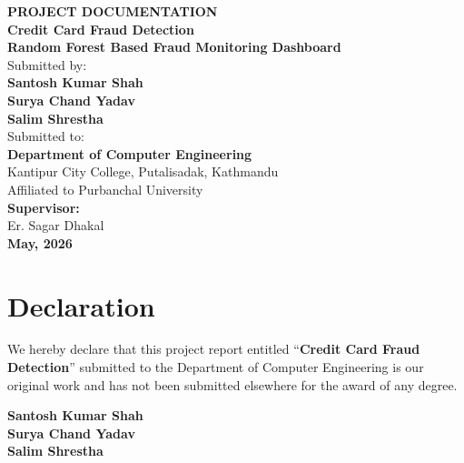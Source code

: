 \documentclass[12pt,a4paper]{report}
\newcommand{\projecttitle}{Credit Card Fraud Detection}
\newcommand{\projectsubtitle}{Random Forest Based Fraud Monitoring Dashboard}
\begin{document}
\setcounter{page}{1}

\begin{titlepage}
    \thispagestyle{empty}
    \centering
    {\Large \textbf{PROJECT DOCUMENTATION}}\\[1cm]

    {\Large \textbf{\projecttitle}}\\[0.25cm]
    {\large \textbf{\projectsubtitle}}\\[2cm]

    {\large Submitted by:}\\[0.5cm]
    {\large \textbf{Santosh Kumar Shah}}\\
    {\large \textbf{Surya Chand Yadav}}\\
    {\large \textbf{Salim Shrestha}}\\[1.5cm]

    {\large Submitted to:}\\[0.4cm]
    {\large \textbf{Department of Computer Engineering}}\\
    {\large Kantipur City College, Putalisadak, Kathmandu}\\
    {\large Affiliated to Purbanchal University}\\[1cm]

    {\large \textbf{Supervisor:}}\\
    {\large Er. Sagar Dhakal}\\[2cm]

    \vfill
    {\large \textbf{May, 2026}}
\end{titlepage}

\chapter*{Declaration}

We hereby declare that this project report entitled ``\textbf{\projecttitle}'' submitted to the Department of Computer Engineering is our original work and has not been submitted elsewhere for the award of any degree.

\vspace{1cm}
\noindent\textbf{Santosh Kumar Shah}\\
\textbf{Surya Chand Yadav}\\
\textbf{Salim Shrestha}
\end{document}
